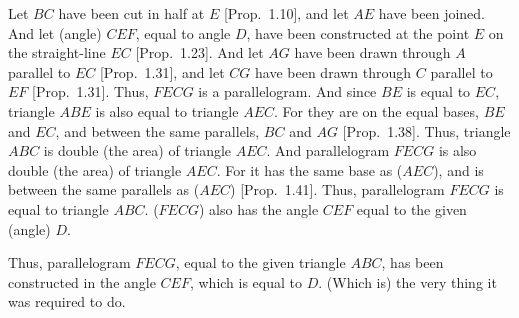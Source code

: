 \begin{Parallel}{}{}
{Let $BC$ have been cut in half at $E$ [Prop.~1.10], and let $AE$ have been joined. And let (angle) $CEF$, equal to angle $D$,  have been constructed
at the point $E$ on the straight-line $EC$ [Prop.~1.23]. And let $AG$ have been drawn through $A$
parallel to $EC$ [Prop.~1.31], and let $CG$ have been drawn through $C$ parallel
to $EF$ [Prop.~1.31]. Thus, $FECG$ is a parallelogram. And since $BE$ is
equal to $EC$, triangle $ABE$ is also equal to triangle $AEC$. For they are
on the equal bases, $BE$ and $EC$, and between the same parallels, $BC$ and $AG$ [Prop.~1.38]. Thus, triangle $ABC$ is double (the area) of triangle $AEC$. And
parallelogram $FECG$ is also double (the area) of triangle $AEC$. For it has the same base as ($AEC$), and is between the same parallels  as ($AEC$) [Prop.~1.41].
Thus, parallelogram $FECG$ is equal to triangle $ABC$.  ($FECG$) also has
the angle $CEF$ equal to the given (angle) $D$.

Thus, parallelogram $FECG$,  equal to the given
triangle $ABC$, has been constructed in the angle $CEF$, which is equal to $D$. (Which is) the
very thing it was required to do.}
\end{Parallel}


